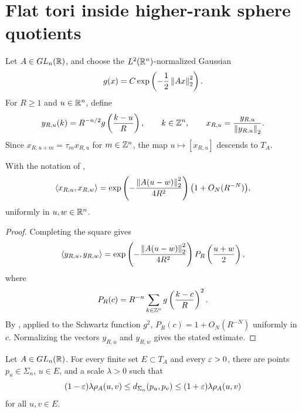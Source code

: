 \section{Flat tori inside higher-rank sphere quotients}

\begin{definition}\label{def:gaussian-lattice-vectors}
\leanok
{}
Let $A\in GL_n(\mathbb R)$, and choose the $L^2(\mathbb R^n)$-normalized Gaussian
\[
        g(x)=C\exp\left(-\frac12\left\lVert Ax\right\rVert_2^2\right).
\]
For $R\ge1$ and $u\in\mathbb R^n$, define
\[
        y_{R,u}(k)=R^{-n/2}g\left(\frac{k-u}{R}\right),
        \qquad k\in\mathbb Z^n,
        \qquad
        x_{R,u}=\frac{y_{R,u}}{\left\lVert y_{R,u}\right\rVert_2}.
\]
Since $x_{R,u+m}=\tau_m x_{R,u}$ for $m\in\mathbb Z^n$, the map
$u\mapsto[x_{R,u}]$ descends to $T_A$.
\end{definition}

\begin{lemma}
\label{lem:gaussian-correlation-asymptotic}
\leanok
{}
With the notation of ,
\begin{equation}\label{eq:gaussian-correlation}
        \left\langle x_{R,u},x_{R,w}\right\rangle
        =\exp\left(-\frac{\left\lVert A(u-w)\right\rVert_2^2}{4R^2}\right)
          \bigl(1+O_N(R^{-N})\bigr),
\end{equation}
uniformly in $u,w\in\mathbb R^n$.
\end{lemma}

\begin{proof}
Completing the square gives
\[
        \left\langle y_{R,u},y_{R,w}\right\rangle
        =\exp\left(-\frac{\left\lVert A(u-w)\right\rVert_2^2}{4R^2}\right)
          P_R\left(\frac{u+w}{2}\right),
\]
where
\[
        P_R(c)=R^{-n}\sum_{k\in\mathbb Z^n}
        g\left(\frac{k-c}{R}\right)^2.
\]
By , applied to the Schwartz function $g^2$,
$P_R(c)=1+O_N(R^{-N})$ uniformly in $c$.  Normalizing the vectors $y_{R,u}$ and
$y_{R,w}$ gives the stated estimate.
\end{proof}

\begin{lemma}\label{lem:tori-in-sigma-n}
\leanok
{}
Let $A\in GL_n(\mathbb R)$.  For every finite set $E\subset T_A$ and every $\varepsilon>0$,
there are points $p_u\in\Sigma_n$, $u\in E$, and a scale $\lambda>0$ such that
\[
        (1-\varepsilon)\lambda\rho_A(u,v)
        \le d_{\Sigma_n}(p_u,p_v)
        \le (1+\varepsilon)\lambda\rho_A(u,v)
\]
for all $u,v\in E$.
\end{lemma}


